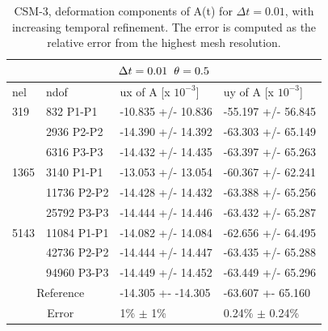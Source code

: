 \begin{table}[h!]
\centering
\begin{tabular}{ |p{1cm}||p{2.7cm}|p{3.3cm}|p{3.3cm}|}
\hline
  \multicolumn{4}{|c|}{$\Delta t = 0.01 \hspace{2mm} \theta = 0.5$} \\
\hline
nel & ndof & ux of A [x $10^{-3}$]  &uy of A [x $10^{-3}$] \\
\hline
    319     & 832 P1-P1 & -10.835       +/-  10.836 & -55.197       +/-  56.845 \\
     & 2936 P2-P2 & -14.390       +/-  14.392 & -63.303       +/-  65.149 \\
      & 6316 P3-P3& -14.432       +/-  14.435 & -63.397       +/-  65.263 \\
    \hline
    1365    & 3140 P1-P1  & -13.053       +/-  13.054 & -60.367       +/-  62.241 \\
     & 11736 P2-P2  & -14.428       +/-  14.432 & -63.388       +/-  65.256 \\
     & 25792 P3-P3  & -14.444       +/-  14.446 & -63.432       +/-  65.287 \\
     \hline
     5143    & 11084 P1-P1 & -14.082       +/-  14.084 & -62.656       +/-  64.495 \\
     & 42736 P2-P2 & -14.444       +/-  14.447 & -63.435       +/-  65.288 \\
     & 94960 P3-P3& -14.449       +/-  14.452 & -63.449       +/-  65.296 \\
 \hline
  \multicolumn{2}{|c|}{Reference}  &-14.305 +- -14.305        & -63.607 +- 65.160    \\
   \hline
    \multicolumn{2}{|c|}{Error}  & 1\% $\pm$ 1\%   & 0.24\% $\pm$ 0.24\%\\
   \hline
\end{tabular}
\caption{CSM-3, deformation components of A(t) for $\Delta t = 0.01$, with increasing temporal refinement. The error is computed as the relative error from the highest mesh resolution.}
\label{table:csm31}
\end{table}
